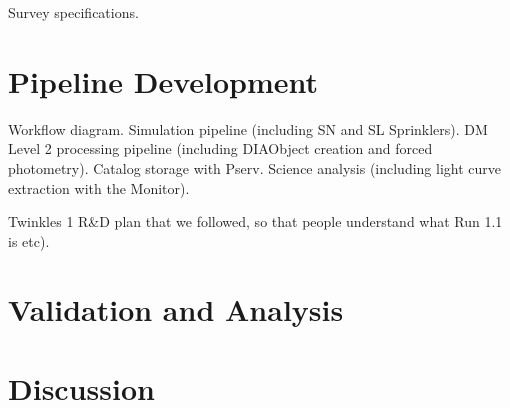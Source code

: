 \documentclass[\docopts]{\docclass}
\begin{document}
Survey specifications.



\section{Pipeline Development}
\label{sec:pipeline}


Workflow diagram. Simulation pipeline (including SN and SL Sprinklers).
DM Level 2 processing pipeline (including DIAObject creation and forced photometry).
Catalog storage with Pserv.
Science analysis (including light curve extraction with the Monitor).

Twinkles 1 R\&D plan that we followed, so that people understand what Run 1.1 is etc).




\section{Validation and Analysis}
\label{sec:analysis}



\section{Discussion}
\label{sec:discussion}


\end{document}
